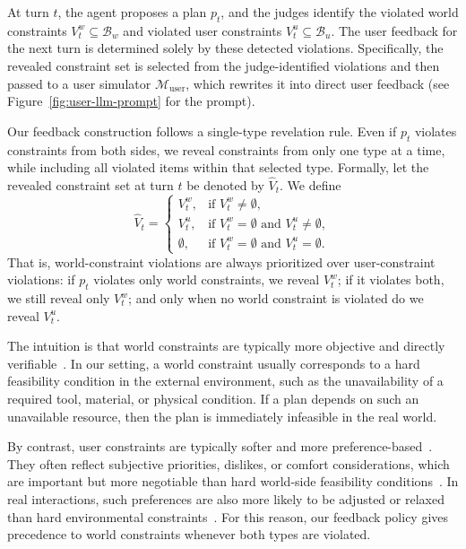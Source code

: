 At turn $t$, the agent proposes a plan $p_t$, and the judges identify the violated world constraints $V_t^w \subseteq \mathcal{B}_w$ and violated user constraints $V_t^u \subseteq \mathcal{B}_u$. 
The user feedback for the next turn is determined solely by these detected violations. 
Specifically, the revealed constraint set is selected from the judge-identified violations and then passed to a user simulator \(\mathcal{M}_{\mathrm{user}}\), which rewrites it into direct user feedback (see Figure~\ref{fig:user-llm-prompt} for the prompt).

Our feedback construction follows a single-type revelation rule. 
Even if $p_t$ violates constraints from both sides, we reveal constraints from only one type at a time, while including all violated items within that selected type. 
Formally, let the revealed constraint set at turn $t$ be denoted by $\widehat{V}_t$. We define
\[
\widehat{V}_t =
\begin{cases}
V_t^w, & \text{if } V_t^w \neq \emptyset,\\
V_t^u, & \text{if } V_t^w = \emptyset \text{ and } V_t^u \neq \emptyset,\\
\emptyset, & \text{if } V_t^w = \emptyset \text{ and } V_t^u = \emptyset.
\end{cases}
\]
That is, world-constraint violations are always prioritized over user-constraint violations: if $p_t$ violates only world constraints, we reveal $V_t^w$; if it violates both, we still reveal only $V_t^w$; and only when no world constraint is violated do we reveal $V_t^u$.

The intuition is that world constraints are typically more objective and directly verifiable~\citep{DBLP:reference/fai/2}. 
In our setting, a world constraint usually corresponds to a hard feasibility condition in the external environment, such as the unavailability of a required tool, material, or physical condition. 
If a plan depends on such an unavailable resource, then the plan is immediately infeasible in the real world. 

By contrast, user constraints are typically softer and more preference-based~\citep{CAMPIGOTTO2021103454}. 
They often reflect subjective priorities, dislikes, or comfort considerations, which are important but more negotiable than hard world-side feasibility conditions~\citep{ali2010goal,Hoang2012DistinguishingSA,qian2026creativitybench}. 
In real interactions, such preferences are also more likely to be adjusted or relaxed than hard environmental constraints~\citep{hauser2009non,narendhar2016different,ghafour2025smart}. 
For this reason, our feedback policy gives precedence to world constraints whenever both types are violated.

